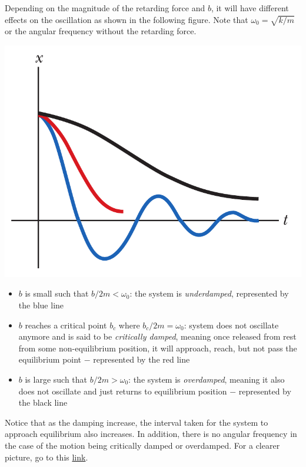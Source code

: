 Depending on the magnitude of the retarding force and $b$, it will have different effects on the
oscillation as shown in the following figure. Note that $\omega_0 = \sqrt{k/m}$ or the angular
frequency without the retarding force.
\begin{center}
    \includegraphics[scale=0.4]{images/oaw/damped02.png}
\end{center}
\begin{itemize}
    \item $b$ is small such that $b/2m < \omega_0$: the system is \textit{underdamped}, represented
        by the blue line
    \item $b$ reaches a critical point $b_c$ where $b_c/2m = \omega_0$: system does not 
        oscillate anymore and is said to be \textit{critically damped}, meaning once released from
        rest from some non-equilibrium position, it will approach, reach, but not pass the
        equilibrium point $-$ represented by the red line
    \item $b$ is large such that $b/2m > \omega_0$: the system is \textit{overdamped}, meaning it also
        does not oscillate and just returns to equilibrium position $-$ represented by the black line
\end{itemize}

Notice that as the damping increase, the interval taken for the system to approach equilibrium also increases.
In addition, there is no angular frequency in the case of the motion being critically damped or overdamped.
For a clearer picture, go to this \href{https://youtu.be/99ZE2RGwqSM}{link}.